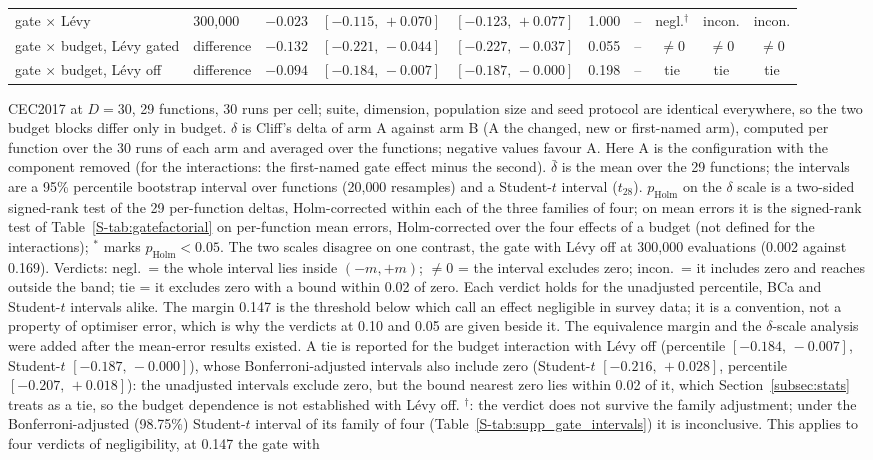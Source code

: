 \begin{table}[htbp]
{\begin{tabular}{llrccccccc}
\quad gate $\times$ L\'evy & 300{,}000 & $-0.023$ & $[-0.115,\,+0.070]$ & $[-0.123,\,+0.077]$ & 1.000 & -- & negl.$^{\dagger}$ & incon. & incon. \\
\quad gate $\times$ budget, L\'evy gated & difference & $-0.132$ & $[-0.221,\,-0.044]$ & $[-0.227,\,-0.037]$ & 0.055 & -- & $\neq0$ & $\neq0$ & $\neq0$ \\
\quad gate $\times$ budget, L\'evy off & difference & $-0.094$ & $[-0.184,\,-0.007]$ & $[-0.187,\,-0.000]$ & 0.198 & -- & tie & tie & tie \\
\bottomrule
\end{tabular}}
\begin{flushleft}\footnotesize
CEC2017 at $D=30$, 29 functions, 30 runs per cell; suite, dimension, population size and seed protocol are identical everywhere, so the two budget blocks differ only in budget. $\delta$ is Cliff's delta of arm A against arm B (A the changed, new or first-named arm), computed per function over the 30 runs of each arm and averaged over the functions; negative values favour A. Here A is the configuration with the component removed (for the interactions: the first-named gate effect minus the second). $\bar\delta$ is the mean over the 29 functions; the intervals are a 95\% percentile bootstrap interval over functions (20{,}000 resamples) and a Student-$t$ interval ($t_{28}$). $p_{\text{Holm}}$ on the $\delta$ scale is a two-sided signed-rank test of the 29 per-function deltas, Holm-corrected within each of the three families of four; on mean errors it is the signed-rank test of Table~\ref{S-tab:gatefactorial} on per-function mean errors, Holm-corrected over the four effects of a budget (not defined for the interactions); $^{*}$ marks $p_{\text{Holm}}<0.05$. The two scales disagree on one contrast, the gate with L\'evy off at 300{,}000 evaluations (0.002 against 0.169). Verdicts: negl.\ = the whole interval lies inside $(-m,+m)$; $\neq0$ = the interval excludes zero; incon.\ = it includes zero and reaches outside the band; tie = it excludes zero with a bound within 0.02 of zero. Each verdict holds for the unadjusted percentile, BCa and Student-$t$ intervals alike. The margin 0.147 is the threshold below which \citet{romano2006appropriate} call an effect negligible in survey data; it is a convention, not a property of optimiser error, which is why the verdicts at 0.10 and 0.05 are given beside it. The equivalence margin and the $\delta$-scale analysis were added after the mean-error results existed. A tie is reported for the budget interaction with L\'evy off (percentile $[-0.184,\,-0.007]$, Student-$t$ $[-0.187,\,-0.000]$), whose Bonferroni-adjusted intervals also include zero (Student-$t$ $[-0.216,\,+0.028]$, percentile $[-0.207,\,+0.018]$): the unadjusted intervals exclude zero, but the bound nearest zero lies within 0.02 of it, which Section~\ref{subsec:stats} treats as a tie, so the budget dependence is not established with L\'evy off. $^{\dagger}$: the verdict does not survive the family adjustment; under the Bonferroni-adjusted (98.75\%) Student-$t$ interval of its family of four (Table~\ref{S-tab:supp_gate_intervals}) it is inconclusive. This applies to four verdicts of negligibility, at 0.147 the gate with 
\end{flushleft}
\end{table}
